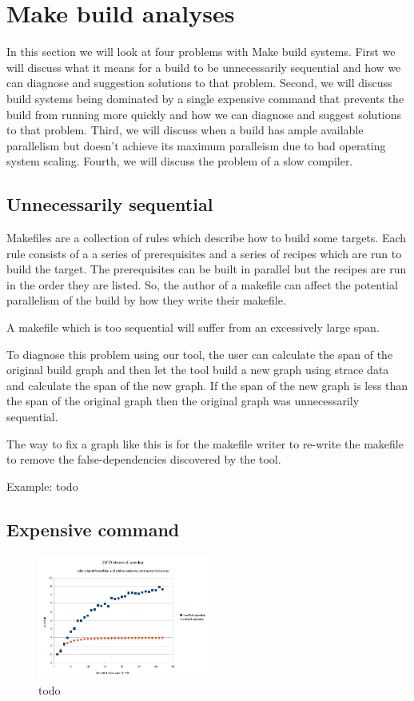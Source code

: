 \documentclass[sigplan,10pt,review,authorversion]{acmart}\settopmatter{printfolios=true,printccs=false,printacmref=false}
\begin{document}
\section{Make build analyses}

In this section we will look at four problems with Make build systems.  First we will discuss
what it means for a build to be unnecessarily sequential and how we can diagnose and suggestion
solutions to that problem.  Second, we will discuss build systems being dominated by a single
expensive command that prevents the build from running more quickly and how we can diagnose and
suggest solutions to that problem.  Third, we will discuss when a build has ample available
parallelism but doesn't achieve its maximum paralleism due to bad operating system scaling.
Fourth, we will discuss the problem of a slow compiler.

\subsection{Unnecessarily sequential}

Makefiles are a collection of rules which describe how to build some targets.  Each rule consists
of a a series of prerequisites and a series of recipes which are run to build the target.  The
prerequisites can be built in parallel but the recipes are run in the order they are listed.  So,
the author of a makefile can affect the potential parallelism of the build by how they write their
makefile.

A makefile which is too sequential will suffer from an excessively large span.

To diagnose this problem using our tool, the user can calculate the span of the original build
graph and then let the tool build a new graph using strace data and calculate the span of the
new graph.  If the span of the new graph is less than the span of the original graph then the
original graph was unnecessarily sequential.

The way to fix a graph like this is for the makefile writer to re-write the makefile to
remove the false-dependencies discovered by the tool.

Example: todo

\subsection{Expensive command}
\label{sec:expensive}

\begin{figure}[t]
  \includegraphics[width=0.5\textwidth]{zstd-speedup}
  \caption{todo}
  \label{fig:zstd}
\end{figure}
\end{document}
